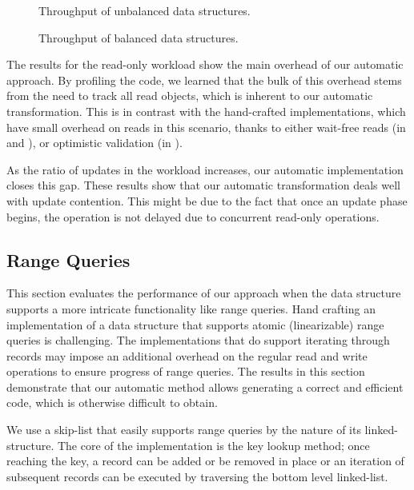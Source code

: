 \begin{figure*}
\begin{center}

\end{center}
\caption{Throughput of unbalanced data structures.}
\label{evaluation:results:unbalanced}
\end{figure*}


\begin{figure*}
\begin{center}

\end{center}
\caption{Throughput of balanced data
structures.}
\label{evaluation:results:balanced}
\end{figure*}

The results for the read-only workload show the main overhead
of our automatic approach. By profiling the code, we learned 
that the bulk of this overhead stems from the need to track all read objects,
which is inherent to our automatic transformation. 
This is in contrast with the hand-crafted implementations,
which have small overhead on reads in this scenario, thanks to either 
wait-free reads (in \danaTree and \danaAVL), or optimistic validation (in \bronson). 
 
As the ratio of updates in the workload increases, our automatic implementation 
closes this gap.
These results show that our automatic transformation deals well with update contention. 
This might be due to the fact that once
an update phase begins, the operation is not delayed due to concurrent 
read-only operations. 


\subsection{Range Queries}
\label{sec:range} 

This section evaluates the performance of our approach when the data
structure supports a more intricate functionality like range queries. Hand
crafting an implementation of a data structure that supports atomic
(linearizable) range queries is challenging.
The implementations that do support iterating through records may impose an
additional overhead on the regular read and write operations to ensure
progress of range queries.
The results in this section demonstrate that our automatic method
allows generating a correct and efficient code, which is otherwise difficult
to obtain.

We use a skip-list that easily supports range queries by the
nature of its linked-structure. The core of the implementation is the key lookup
method; once reaching the key, a record can be added or be removed in place or
an iteration of subsequent records can be executed by traversing
the bottom level linked-list.

